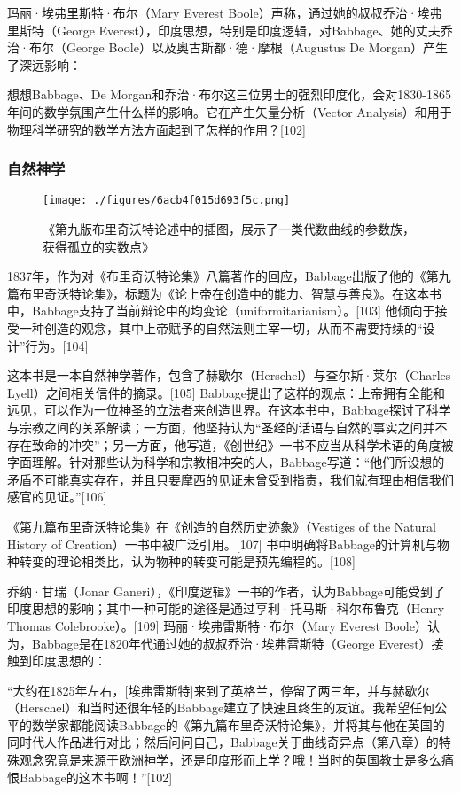 玛丽·埃弗里斯特·布尔（Mary Everest Boole）声称，通过她的叔叔乔治·埃弗里斯特（George Everest），印度思想，特别是印度逻辑，对Babbage、她的丈夫乔治·布尔（George Boole）以及奥古斯都·德·摩根（Augustus De Morgan）产生了深远影响：

想想Babbage、De Morgan和乔治·布尔这三位男士的强烈印度化，会对1830-1865年间的数学氛围产生什么样的影响。它在产生矢量分析（Vector Analysis）和用于物理科学研究的数学方法方面起到了怎样的作用？[102]
\subsubsection{自然神学}
\begin{figure}[ht]
\centering
\texttt{[image: ./figures/6acb4f015d693f5c.png]}
\caption{《第九版布里奇沃特论述中的插图，展示了一类代数曲线的参数族，获得孤立的实数点》} \label{fig_CRSBQ_3}
\end{figure}
1837年，作为对《布里奇沃特论集》八篇著作的回应，Babbage出版了他的《第九篇布里奇沃特论集》，标题为《论上帝在创造中的能力、智慧与善良》。在这本书中，Babbage支持了当前辩论中的均变论（uniformitarianism）。[103] 他倾向于接受一种创造的观念，其中上帝赋予的自然法则主宰一切，从而不需要持续的“设计”行为。[104]

这本书是一本自然神学著作，包含了赫歇尔（Herschel）与查尔斯·莱尔（Charles Lyell）之间相关信件的摘录。[105] Babbage提出了这样的观点：上帝拥有全能和远见，可以作为一位神圣的立法者来创造世界。在这本书中，Babbage探讨了科学与宗教之间的关系解读；一方面，他坚持认为“圣经的话语与自然的事实之间并不存在致命的冲突”；另一方面，他写道，《创世纪》一书不应当从科学术语的角度被字面理解。针对那些认为科学和宗教相冲突的人，Babbage写道：“他们所设想的矛盾不可能真实存在，并且只要摩西的见证未曾受到指责，我们就有理由相信我们感官的见证。”[106]

《第九篇布里奇沃特论集》在《创造的自然历史迹象》（Vestiges of the Natural History of Creation）一书中被广泛引用。[107] 书中明确将Babbage的计算机与物种转变的理论相类比，认为物种的转变可能是预先编程的。[108]

乔纳·甘瑞（Jonar Ganeri），《印度逻辑》一书的作者，认为Babbage可能受到了印度思想的影响；其中一种可能的途径是通过亨利·托马斯·科尔布鲁克（Henry Thomas Colebrooke）。[109] 玛丽·埃弗雷斯特·布尔（Mary Everest Boole）认为，Babbage是在1820年代通过她的叔叔乔治·埃弗雷斯特（George Everest）接触到印度思想的：

“大约在1825年左右，[埃弗雷斯特]来到了英格兰，停留了两三年，并与赫歇尔（Herschel）和当时还很年轻的Babbage建立了快速且终生的友谊。我希望任何公平的数学家都能阅读Babbage的《第九篇布里奇沃特论集》，并将其与他在英国的同时代人作品进行对比；然后问问自己，Babbage关于曲线奇异点（第八章）的特殊观念究竟是来源于欧洲神学，还是印度形而上学？哦！当时的英国教士是多么痛恨Babbage的这本书啊！”[102]
